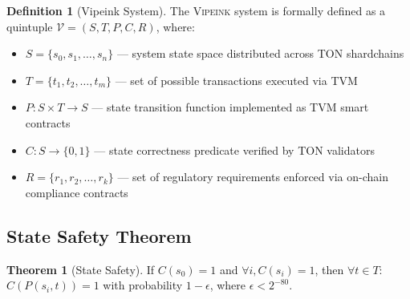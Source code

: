 \documentclass[12pt,a4paper]{article}
\theoremstyle{definition}
\newtheorem{definition}{Definition}[section]
\newtheorem{theorem}{Theorem}[section]
\theoremstyle{remark}
\newcommand{\Vipeink}{\textsc{Vipeink}}
\begin{document}
\begin{definition}[Vipeink System]
The \Vipeink{} system is formally defined as a quintuple $\mathcal{V} = (S, T, P, C, R)$, where:
\begin{itemize}[nosep]
    \item $S = \{s_0, s_1, \ldots, s_n\}$ --- system state space distributed across TON shardchains
    \item $T = \{t_1, t_2, \ldots, t_m\}$ --- set of possible transactions executed via TVM
    \item $P: S \times T \to S$ --- state transition function implemented as TVM smart contracts
    \item $C: S \to \{0,1\}$ --- state correctness predicate verified by TON validators
    \item $R = \{r_1, r_2, \ldots, r_k\}$ --- set of regulatory requirements enforced via on-chain compliance contracts
\end{itemize}
\end{definition}

\subsection{State Safety Theorem}

\begin{theorem}[State Safety]
\label{thm:state-safety}
If $C(s_0) = 1$ and $\forall i, C(s_i) = 1$, then $\forall t \in T$: $C(P(s_i, t)) = 1$ with probability $1 - \epsilon$, where $\epsilon < 2^{-80}$.
\end{theorem}
\end{document}
